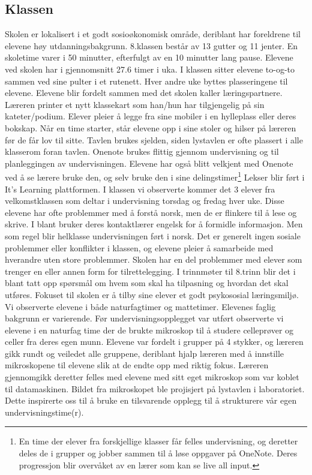 \documentclass[main.tex]{subfiles}
\begin{document}
\subsection*{Klassen}
Skolen er lokalisert i et godt sosioøkonomisk område, deriblant har foreldrene til elevene høy utdanningsbakgrunn. 8.klassen består av 13 gutter og 11 jenter. En skoletime varer i 50 minutter, efterfulgt av en 10 minutter lang pause. Elevene ved skolen har i gjennomsnitt 27.6 timer i uka. I klassen sitter elevene to-og-to sammen ved sine pulter i et rutenett. Hver andre uke byttes plasseringene til elevene. Elevene blir fordelt sammen med det skolen kaller læringspartnere. Læreren printer et nytt klassekart som han/hun har tilgjengelig på sin kateter/podium. Elever pleier å legge fra sine mobiler i en hylleplass eller deres bokskap. Når en time starter, står elevene opp i sine stoler og hilser på læreren før de får lov til sitte. Tavlen brukes sjelden, siden lystavlen er ofte plassert i alle klasserom foran tavlen. Onenote brukes flittig gjennom undervisning og til planleggingen av undervisningen. Elevene har også blitt velkjent med Onenote ved å se lærere bruke den, og selv bruke den i sine delingstimer\footnote{En time der elever fra forskjellige klasser får felles undervisning, og deretter deles de i grupper og jobber sammen til å løse oppgaver på OneNote. Deres progressjon blir overvåket av en lærer som kan se live all input.} Lekser blir ført i It’s Learning plattformen. I klassen vi observerte kommer det 3 elever fra velkomstklassen som deltar i undervisning torsdag og fredag hver uke. Disse elevene har ofte problemmer med å forstå norsk, men de er flinkere til å lese og skrive. I blant bruker deres kontaktlærer engelsk for å formidle informasjon. Men som regel blir helklasse undervisningen ført i norsk. Det er generelt ingen sosiale problemmer eller konflikter i klassen, og elevene pleier å samarbeide med hverandre uten store problemmer. Skolen har en del problemmer med elever som trenger en eller annen form for tilrettelegging. I trinnmøter til 8.trinn blir det i blant tatt opp spørsmål om hvem som skal ha tilpasning og hvordan det skal utføres. Fokuset til skolen er å tilby sine elever et godt psykososial læringsmiljø.
\newline
Vi observerte elevene i både naturfagtimer og mattetimer. Elevenes faglig bakgrunn er varierende. Før 
undervisningsopplegget var utført observerte vi elevene i en naturfag time der de brukte mikroskop til å studere 
celleprøver og celler fra deres egen munn. Elevene var fordelt i grupper på 4 stykker, og læreren gikk rundt og 
veiledet alle gruppene, deriblant hjalp læreren med å innstille mikroskopene til elevene slik at de endte opp med
riktig fokus. Læreren gjennomgikk deretter felles med elevene med sitt eget mikroskop
som var koblet til datamaskinen. Bildet fra mikroskopet ble projisjert på lystavlen i laboratoriet. Dette inspirerte 
oss til å bruke en tilsvarende opplegg til å strukturere vår egen undervisningstime(r).
\end{document}

